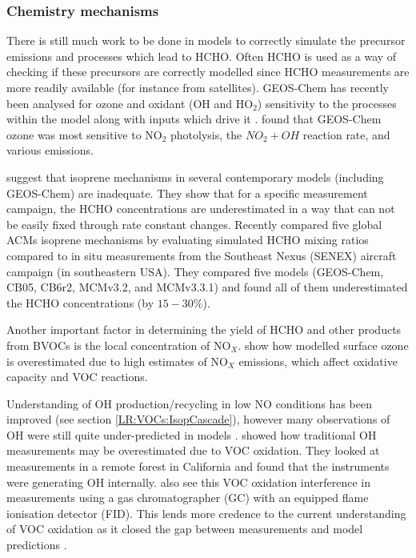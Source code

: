     
    \subsubsection{Chemistry mechanisms}
      \label{LR:Models:Uncert:Chemistry}
      There is still much work to be done in models to correctly simulate the precursor emissions and processes which lead to HCHO.
      Often HCHO is used as a way of checking if these precursors are correctly modelled since HCHO measurements are more readily available (for instance from satellites).
      GEOS-Chem has recently been analysed for ozone and oxidant (OH and HO$_2$) sensitivity to the processes within the model along with inputs which drive it \parencite{Christian2017}.
      \textcite{Christian2017} found that GEOS-Chem ozone was most sensitive to NO$_2$ photolysis, the $NO_2 + OH$ reaction rate, and various emissions.

      \textcite{Marvin2017} suggest that isoprene mechanisms in several contemporary models (including GEOS-Chem) are inadequate. 
      They show that for a specific measurement campaign, the HCHO concentrations are underestimated in a way that can not be easily fixed through rate constant changes.
      Recently \textcite{Marvin2017} compared five global ACMs isoprene mechanisms by evaluating simulated HCHO mixing ratios compared to in situ measurements from the Southeast Nexus (SENEX) aircraft campaign (in southeastern USA).
      They compared five models (GEOS-Chem, CB05, CB6r2, MCMv3.2, and MCMv3.3.1) and found all of them underestimated the HCHO concentrations (by $15 - 30\%$).
      
      Another important factor in determining the yield of HCHO and other products from BVOCs is the local concentration of NO$_X$.
      \textcite{Travis2016} show how modelled surface ozone is overestimated due to high estimates of NO$_X$ emissions, which affect oxidative capacity and VOC reactions.
      
      Understanding of OH production/recycling in low NO conditions has been improved (see section \ref{LR:VOCs:IsopCascade}), however many observations of OH were still quite under-predicted in models \parencite{Mao2012}.
      \textcite{Mao2012} showed how traditional OH measurements may be overestimated due to VOC oxidation.
      They looked at measurements in a remote forest in California and found that the instruments were generating OH internally.
      \textcite{Nguyen2014} also see this VOC oxidation interference in measurements using a gas chromatographer (GC) with an equipped flame ionisation detector (FID).
      This lends more credence to the current understanding of VOC oxidation as it closed the gap between measurements and model predictions \parencite{Mao2012}.
    
